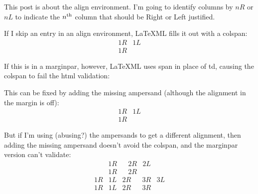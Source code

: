 \documentclass[oneside]{book}
\begin{document}
\pagestyle{empty}

%
%
%
%


This post is about the align environment.  I'm going to identify columns by $nR$ or $nL$ to indicate the $n\textsuperscript{th}$ column that should be Right or Left justified.

If I skip an entry in an align environment, LaTeXML fills it out with a colspan:
\begin{align*}1R&1L\\1R\end{align*} %

If this is in a marginpar, however, LaTeXML uses span in place of td, causing the colspan to fail the html validation:

This can be fixed by adding the missing ampersand (although the alignment in the margin is off):
\begin{align*}1R&1L\\1R&\end{align*} %

But if I'm using (abusing?) the ampersands to get a different alignment, then adding the missing ampersand doesn't avoid the colspan, and the marginpar version can't validate:
\begin{align*}1R&&2R&2L\\1R&&2R&\end{align*}
\begin{align*}1R&1L&2R&&3R&3L\\1R&1L&2R&&3R&\end{align*}
\end{document}
